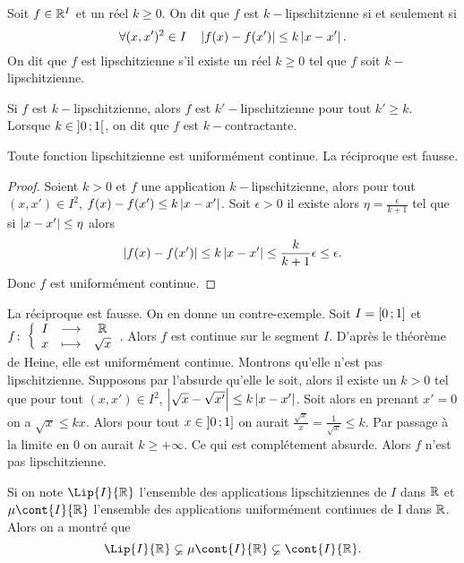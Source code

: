 \begin{defdef}
  Soit $f \in \mathbb{R}^I$ et un réel $k \geq 0$. On dit que $f$ est $k-$lipschitzienne si et seulement si
  \begin{equation}
    \forall (x,x')^2 \in I \quad \left\lvert f(x)-f(x')\right\rvert \leq k \left\lvert x-x'\right\rvert.
  \end{equation}
  On dit que $f$ est lipschitzienne s'il existe un réel $k \geq 0$ tel que $f$ soit $k-$lipschitzienne.
\end{defdef}
Si $f$ est $k-$lipschitzienne, alors $f$ est $k'-$lipschitzienne pour tout $k' \geq k$. Lorsque $k \in \left] 0 \, ;  1 \right[$, on dit que $f$ est $k-$contractante.
%
\begin{theo}
  Toute fonction lipschitzienne est uniformément continue. La réciproque est fausse.
\end{theo}
\begin{proof}
  Soient $k >0$ et $f$ une application $k-$lipschitzienne, alors pour tout $(x,x') \in I^2$, $f(x)-f(x') \leq k\left\lvert x-x'\right\rvert$. Soit $\epsilon >0$ il existe alors $\eta = \frac{\epsilon}{k+1}$ tel que si $\left\lvert x-x'\right\rvert \leq \eta$ alors 
\begin{equation}
  \left\lvert f(x)-f(x')\right\rvert \leq k\left\lvert x-x'\right\rvert \leq \frac{k}{k+1} \epsilon \leq \epsilon.
\end{equation}
Donc $f$ est uniformément continue.
\end{proof}
La réciproque est fausse. On en donne un contre-exemple. Soit $I=\left[ 0 \, ;  1 \right]$ et $f\colon \left\{\begin{array}{ccc} I & \longrightarrow &\mathbb{R}\\ x & \longmapsto & \sqrt{x} \end{array} \right.$. Alors $f$ est continue sur le segment $I$. D'après le théorème de Heine, elle est uniformément continue. Montrons qu'elle n'est pas lipschitzienne. Supposons par l'absurde qu'elle le soit, alors il existe un $k >0$ tel que pour tout $(x,x') \in I^2$, $\left\lvert\sqrt{x}-\sqrt{x'}\right\rvert \leq k\left\lvert x-x'\right\rvert$. Soit alors en prenant $x'=0$ on a $\sqrt{x} \leq k x$. Alors pour tout $x \in \left] 0 \, ;  1 \right]$ on aurait $\frac{\sqrt{x}}{x}=\frac{1}{\sqrt{x}} \leq k$. Par passage à la limite en $0$ on aurait $k \geq + \infty$. Ce qui est complétement absurde. Alors $f$ n'est pas lipschitzienne.

Si on note $\Lip{I}{\R}$ l'ensemble des applications lipschitziennes de $I$ dans $\mathbb{R}$ et $\mu\cont{I}{\R}$ l'ensemble des applications uniformément continues de I dans $\mathbb{R}$. Alors on a montré que
\begin{equation}
  \Lip{I}{\R} \varsubsetneq \mu\cont{I}{\R} \varsubsetneq \cont{I}{\R}.
\end{equation}

